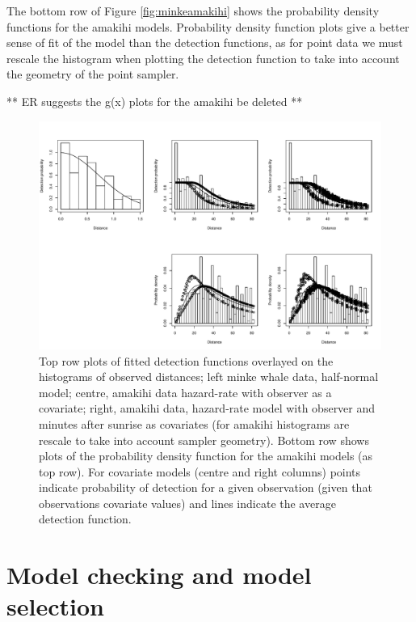 \documentclass[article]{jss}
\begin{document}
The bottom row of Figure \ref{fig:minkeamakihi} shows the probability
density functions for the amakihi models. Probability density function
plots give a better sense of fit of the model than the detection
functions, as for point data we must rescale the histogram when plotting
the detection function to take into account the geometry of the point
sampler.

** ER suggests the g(x) plots for the amakihi be deleted **

\begin{CodeChunk}
\begin{figure}

{\centering \includegraphics{paper_files/figure-latex/minke-amakihi-hn-plot-1} 

}

\caption{Top row plots of fitted detection functions overlayed on the histograms of observed distances; left minke whale data, half-normal model; centre, amakihi data hazard-rate with observer as a covariate; right, amakihi data, hazard-rate model with observer and minutes after sunrise as covariates (for amakihi histograms are rescale to take into account sampler geometry). Bottom row shows plots of the probability density function for the amakihi models (as top row). For covariate models (centre and right columns) points indicate probability of detection for a given observation (given that observations covariate values) and lines indicate the average detection function.\label{fig:minkeamakihi}}\label{fig:minke-amakihi-hn-plot}
\end{figure}
\end{CodeChunk}

\section{Model checking and model
selection}\label{model-checking-and-model-selection}
\end{document}

